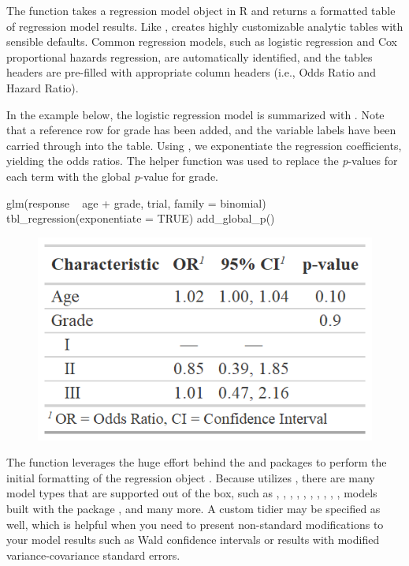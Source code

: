 The  function takes a regression model object in R and returns a formatted table of regression model results.
Like ,  creates highly customizable analytic tables with sensible defaults.
Common regression models, such as logistic regression and Cox proportional hazards regression, are automatically identified, and the tables headers are pre-filled with appropriate column headers (i.e., Odds Ratio and Hazard Ratio).

In the example below, the logistic regression model is summarized with .
Note that a reference row for grade has been added, and the variable labels have been carried through into the table.
Using , we exponentiate the regression coefficients, yielding the odds ratios.
The helper function  was used to replace the \emph{p}-values for each term with the global \emph{p}-value for grade.

\begin{example}
glm(response ~ age + grade, trial, family = binomial) %
  tbl_regression(exponentiate = TRUE) %
  add_global_p()
\end{example}

\begin{figure}[h!]
  \includegraphics[scale=0.73]{regression.png}
  \centering
\end{figure}

The  function leverages the huge effort behind the  and  packages to perform the initial formatting of the regression object \citep{broom}\citep{broom.helpers}.
Because  utilizes , there are many model types that are supported out of the box, such as , , , , , , , , , , models built with the  package \citep{mice}, and many more.
A custom tidier may be specified as well, which is helpful when you need to present non-standard modifications to your model results such as Wald confidence intervals or results with modified variance-covariance standard errors.

